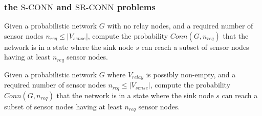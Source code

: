 \documentclass{beamer}
\newcommand{\SCONN}   { {\mathrm {S\mbox{-}CONN}} }
\newcommand{\SRCONN}   { {\mathrm {SR\mbox{-}CONN}} }
\begin{document}
\begin{frame}
\frametitle{the $\SCONN$ and $\SRCONN$ problems}

\begin{definition}
Given a probabilistic network $G$ with no relay nodes, and a required number of sensor nodes $n_{req}\leq |V_{sense}|$, compute the probability $Conn(G,n_{req})$ that the network is in a state where the sink node $s$ can reach a subset of sensor nodes having at least $n_{req}$ sensor nodes. 
\end{definition}


\begin{definition}

Given a probabilistic network $G$ where $V_{relay}$ is possibly non-empty, and a required number of sensor nodes $n_{req}\leq |V_{sense}|$, compute the probability $Conn(G,n_{req})$ that the network is in a state where the sink node $s$ can reach a subset of sensor nodes having at least $n_{req}$ sensor nodes. 
\end{definition}

\end{frame}

\end{document}
